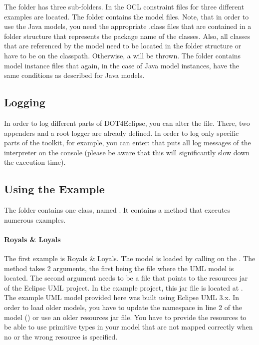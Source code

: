 The  folder has three sub-folders. In  the OCL constraint files for three different examples are located. The  folder contains the model files. Note, that in order to use the Java models, you need the appropriate .class files that are contained in a folder structure that represents the package name of the classes. Also, all classes that are referenced by the model need to be located in the folder structure or have to be on the classpath. Otherwise, a  will be thrown. The  folder contains model instance files that again, in the case of Java model instances, have the same conditions as described for Java models.

\subsection{Logging}

In order to log different parts of \acl{DOT4Eclipse}, you can alter the  file. There, two appenders and a root logger are already defined. In order to log only specific parts of the toolkit, for example, you can enter:  that puts all log messages of the interpreter on the console (please be aware that this will significantly slow down the execution time).

\subsection{Using the Example}

The  folder contains one class, named . It contains a  method that executes numerous examples. 

\paragraph{Royals & Loyals}
The first example is Royals & Loyals. The model is loaded by calling  on the . The method takes 2 arguments, the first being the file where the UML model is located. The second argument needs to be a file that points to the resources jar of the Eclipse UML project. In the example project, this jar file is located at . The example UML model provided here was built using Eclipse UML 3.x. In order to load older models, you have to update the namespace in line 2 of the model () or use an older resources jar file. You have to provide the resources to be able to use primitive types in your model that are not mapped correctly when no or the wrong resource is specified.

